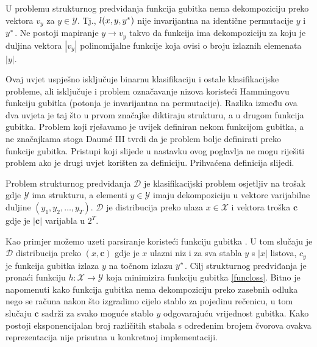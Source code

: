 \begin{condition}

  U problemu strukturnog predviđanja funkcija gubitka nema dekompoziciju preko
  vektora $v_y$ za $y \in \mathcal{Y}$. Tj., $l(x, y, y\ssymbol{1})$ nije
  invarijantna na identične permutacije $y$ i $y\ssymbol{1}$. Ne postoji
  mapiranje $y \to v_y$ takvo da funkcija ima dekompoziciju za koju je duljina
  vektora $|v_y|$ polinomijalne funkcije koja ovisi o broju izlaznih elemenata
  $|y|$.

\end{condition}

Ovaj uvjet uspješno isključuje binarnu klasifikaciju i ostale klasifikacijske
probleme, ali isključuje i problem označavanje nizova koristeći Hammingovu
funkciju gubitka (potonja je invarijantna na permutacije). Razlika između ova
dva uvjeta je taj što u prvom značajke diktiraju strukturu, a u drugom funkcija
gubitka. Problem koji rješavamo je uvijek definiran nekom funkcijom gubitka, a
ne značajkama stoga Daum\'e III tvrdi da je problem bolje definirati preko
funkcije gubitka. Pristupi koji slijede u nastavku ovog poglavlja ne mogu
riješiti problem ako je drugi uvjet korišten za definiciju. Prihvaćena
definicija slijedi.

\begin{definition} \label{jointlearndef}

  Problem strukturnog predviđanja $\mathcal{D}$ je klasifikacijski problem
  osjetljiv na trošak  gdje
  $\mathcal{Y}$ ima strukturu, a elementi $y \in \mathcal{Y}$ imaju
  dekompoziciju u vektore varijabilne duljine $(y_1, y_2, \ldots, y_T)$.
  $\mathcal{D}$ je distribucija preko ulaza $x \in \mathcal{X}$ i vektora troška
  $\mathbf{c}$ gdje je $|\mathbf{c}|$ varijabla u $2^T$.

\end{definition}

Kao primjer možemo uzeti parsiranje koristeći funkciju gubitka
. U tom slučaju je $\mathcal{D}$ distribucija preko $(x,
\mathbf{c})$ gdje je $x$ ulazni niz i za sva stabla $y$ s $|x|$ listova, $c_y$
je funkcija gubitka  izlaza $y$ na točnom izlazu
$y\ssymbol{1}$. Cilj strukturnog predviđanja je pronaći funkciju $h: \mathcal{X}
\rightarrow \mathcal{Y}$ koja minimizira funkciju gubitka \ref{funcloss}. Bitno
je napomenuti kako funkcija gubitka  nema dekompoziciju
preko zasebnih odluka nego se računa nakon što izgradimo cijelo stablo za
pojedinu rečenicu, u tom slučaju $\mathbf{c}$ sadrži za svako moguće stablo $y$
odgovarajuću vrijednost  gubitka. Kako postoji
eksponencijalan broj različitih stabala s određenim brojem čvorova ovakva
reprezentacija nije prisutna u konkretnoj implementaciji.

